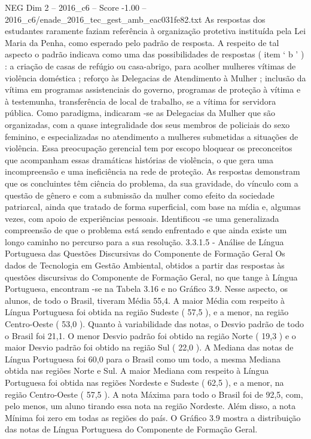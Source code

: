 \begin{textsample}{NEG Dim 2 – 2016\_c6 – Score -1.00 – 2016\_c6/enade\_2016\_tec\_gest\_amb\_eac031fe82.txt}
As respostas dos estudantes raramente faziam referência à organização protetiva instituída pela Lei Maria da Penha, como esperado pelo padrão de resposta.
A respeito de tal aspecto o padrão indicava como uma das possibilidades de respostas ( item ‘ b ’ ) : a criação de casas de refúgio ou casa-abrigo, para acolher mulheres vítimas de violência doméstica ; reforço às Delegacias de Atendimento à Mulher ; inclusão da vítima em programas assistenciais do governo, programas de proteção à vítima e à testemunha, transferência de local de trabalho, se a vítima for servidora pública.
Como paradigma, indicaram -se as Delegacias da Mulher que são organizadas, com a quase integralidade dos seus membros de policiais do sexo feminino, e especializadas no atendimento a mulheres submetidas a situações de violência.
Essa preocupação gerencial tem por escopo bloquear os preconceitos que acompanham essas dramáticas histórias de violência, o que gera uma incompreensão e uma ineficiência na rede de proteção.
As respostas demonstram que os concluintes têm ciência do problema, da sua gravidade, do vínculo com a questão de gênero e com a submissão da mulher como efeito da sociedade patriarcal, ainda que tratado de forma superficial, com base na mídia e, algumas vezes, com apoio de experiências pessoais.
Identificou -se uma generalizada compreensão de que o problema está sendo enfrentado e que ainda existe um longo caminho no percurso para a sua resolução. 3.3.1.5 - Análise de Língua Portuguesa das Questões Discursivas do Componente de Formação Geral Os dados de Tecnologia em Gestão Ambiental, obtidos a partir das respostas às questões discursivas do Componente de Formação Geral, no que tange à Língua Portuguesa, encontram -se na Tabela 3.16 e no Gráfico 3.9.
Nesse aspecto, os alunos, de todo o Brasil, tiveram Média 55,4.
A maior Média com respeito à Língua Portuguesa foi obtida na região Sudeste ( 57,5 ), e a menor, na região Centro-Oeste ( 53,0 ).
Quanto à variabilidade das notas, o Desvio padrão de todo o Brasil foi 21,1.
O menor Desvio padrão foi obtido na região Norte ( 19,3 ) e o maior Desvio padrão foi obtido na região Sul ( 22,0 ).
A Mediana das notas de Língua Portuguesa foi 60,0 para o Brasil como um todo, a mesma Mediana obtida nas regiões Norte e Sul.
A maior Mediana com respeito à Língua Portuguesa foi obtida nas regiões Nordeste e Sudeste ( 62,5 ), e a menor, na região Centro-Oeste ( 57,5 ).
A nota Máxima para todo o Brasil foi de 92,5, com, pelo menos, um aluno tirando essa nota na região Nordeste.
Além disso, a nota Mínima foi zero em todas as regiões do país.
O Gráfico 3.9 mostra a distribuição das notas de Língua Portuguesa do Componente de Formação Geral.

\end{textsample}
